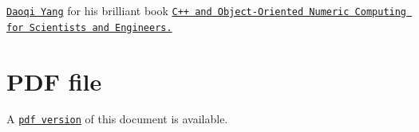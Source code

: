 \begin{DoxyItemize}
\item \href{http://www.math.wayne.edu/~yang/}{\tt Daoqi Yang} for his brilliant book \href{http://www.springeronline.com/sgw/cda/frontpage/0,11855,4-40007-22-2105335-0,00.html?changeHeader=true}{\tt C++ and Object-\/\+Oriented Numeric Computing for Scientists and Engineers.} ~\newline
~\newline
 

 

 
\end{DoxyItemize}\hypertarget{index_pdf}{}\section{P\+D\+F file}\label{index_pdf}
A \href{../latex/refman.pdf}{\tt pdf version} of this document is available. 
